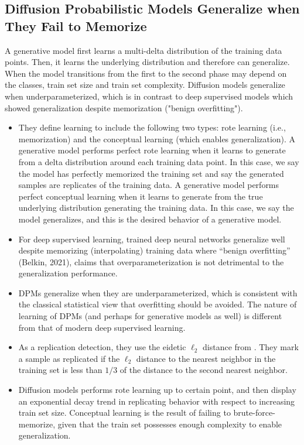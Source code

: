 \documentclass{article}
\begin{document}
\subsection{Diffusion Probabilistic Models Generalize when They Fail to Memorize}
\begin{tldr}
    A generative model first learns a multi-delta distribution of the training data points. Then, it learns the underlying distribution and therefore can generalize. When the model transitions from the first to the second phase may depend on the classes, train set size and train set complexity. Diffusion models generalize when underparameterized, which is in contrast to deep supervised models which showed generalization despite memorization ("benign overfitting"). 
\end{tldr}
\begin{itemize}
    \item They define learning to include the following two types: rote learning (i.e., memorization) and the conceptual learning (which enables generalization). A generative model performs perfect rote learning when it learns to generate from a delta distribution around each training data point. In this case, we say the model has perfectly memorized the training set and say the generated samples are replicates of the training data. A generative model performs perfect conceptual learning when it learns to generate from the true underlying distribution generating the training data. In this case, we say the model generalizes, and this is the desired behavior of a generative model.
    \item For deep supervised learning, trained deep neural networks generalize well despite memorizing (interpolating) training data where “benign overfitting” (Belkin, 2021), claims that overparameterization is not detrimental to the generalization performance.
    \item DPMs generalize when they are underparameterized, which is consistent with the classical statistical view that overfitting should be avoided. The nature of learning of DPMs (and perhaps for generative models as well) is different from that of modern deep supervised learning.
    \item As a replication detection, they use the eidetic $\ell_2$ distance from \cite{carlini2023extracting}. They mark a sample as replicated if the $\ell_2$ distance to the nearest neighbor in the training set is less than $1/3$ of the distance to the second nearest neighbor.
    \item Diffusion models performs rote learning up to certain point, and then display an exponential decay trend in replicating behavior with respect to increasing train set size. Conceptual learning is the result of failing to brute-force-memorize, given that the train set possesses enough complexity to enable generalization.

\end{itemize}
\end{document}
